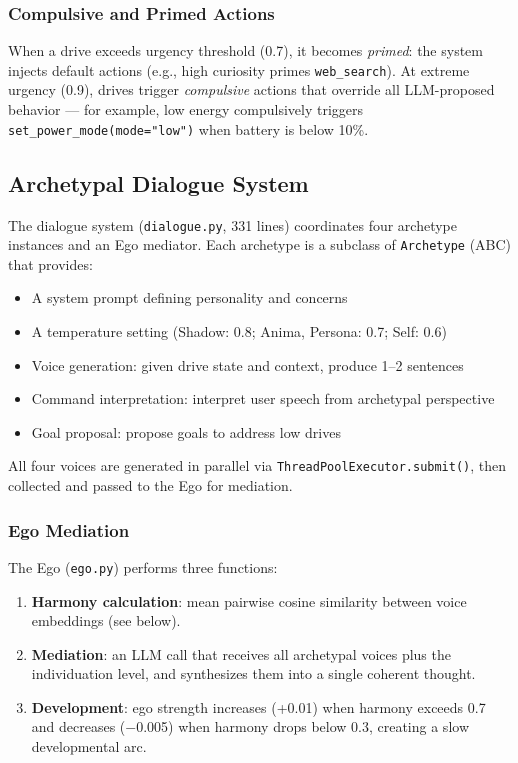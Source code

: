 \documentclass[11pt,oneside]{article}
\begin{document}
\subsubsection{Compulsive and Primed Actions}

When a drive exceeds urgency threshold (0.7), it becomes \emph{primed}: the system injects default actions (e.g., high curiosity primes \texttt{web\_search}).
At extreme urgency (0.9), drives trigger \emph{compulsive} actions that override all LLM-proposed behavior --- for example, low energy compulsively triggers \texttt{set\_power\_mode(mode="low")} when battery is below 10\%.

\subsection{Archetypal Dialogue System}

The dialogue system (\texttt{dialogue.py}, 331 lines) coordinates four archetype instances and an Ego mediator.
Each archetype is a subclass of \texttt{Archetype} (ABC) that provides:

\begin{itemize}
  \item A system prompt defining personality and concerns
  \item A temperature setting (Shadow: 0.8; Anima, Persona: 0.7; Self: 0.6)
  \item Voice generation: given drive state and context, produce 1--2 sentences
  \item Command interpretation: interpret user speech from archetypal perspective
  \item Goal proposal: propose goals to address low drives
\end{itemize}

All four voices are generated in parallel via \texttt{ThreadPoolExecutor.submit()}, then collected and passed to the Ego for mediation.

\subsubsection{Ego Mediation}

The Ego (\texttt{ego.py}) performs three functions:

\begin{enumerate}
  \item \textbf{Harmony calculation}: mean pairwise cosine similarity between voice embeddings (see below).
  \item \textbf{Mediation}: an LLM call that receives all archetypal voices plus the individuation level, and synthesizes them into a single coherent thought.
  \item \textbf{Development}: ego strength increases (+0.01) when harmony exceeds 0.7 and decreases ($-$0.005) when harmony drops below 0.3, creating a slow developmental arc.
\end{enumerate}
\end{document}
